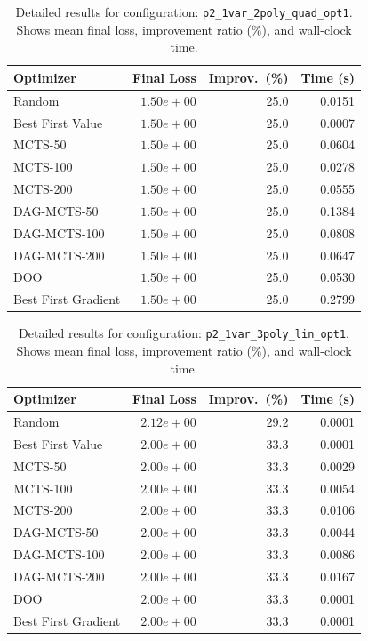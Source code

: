 \begin{table}[H]
\centering
\caption{Detailed results for configuration: \texttt{p2\_1var\_2poly\_quad\_opt1}. Shows mean final loss, improvement ratio (\%), and wall-clock time.}
\label{tab:abssum-detail-2}
\begin{tabular}{lrrr}
\toprule
Optimizer & Final Loss & Improv.~(\%) & Time (s) \\
\midrule
Random & \textbf{$1.50e+00$} & 25.0 & 0.0151 \\
\hline
Best First Value & \textbf{$1.50e+00$} & 25.0 & 0.0007 \\
\hline
MCTS-50 & \textbf{$1.50e+00$} & 25.0 & 0.0604 \\
\hline
MCTS-100 & \textbf{$1.50e+00$} & 25.0 & 0.0278 \\
\hline
MCTS-200 & \textbf{$1.50e+00$} & 25.0 & 0.0555 \\
\hline
DAG-MCTS-50 & \textbf{$1.50e+00$} & 25.0 & 0.1384 \\
\hline
DAG-MCTS-100 & \textbf{$1.50e+00$} & 25.0 & 0.0808 \\
\hline
DAG-MCTS-200 & \textbf{$1.50e+00$} & 25.0 & 0.0647 \\
\hline
DOO & \textbf{$1.50e+00$} & 25.0 & 0.0530 \\
\hline
Best First Gradient & \textbf{$1.50e+00$} & 25.0 & 0.2799 \\
\bottomrule
\end{tabular}
\end{table}

\begin{table}[H]
\centering
\caption{Detailed results for configuration: \texttt{p2\_1var\_3poly\_lin\_opt1}. Shows mean final loss, improvement ratio (\%), and wall-clock time.}
\label{tab:abssum-detail-3}
\begin{tabular}{lrrr}
\toprule
Optimizer & Final Loss & Improv.~(\%) & Time (s) \\
\midrule
Random & $2.12e+00$ & 29.2 & 0.0001 \\
\hline
Best First Value & \textbf{$2.00e+00$} & 33.3 & 0.0001 \\
\hline
MCTS-50 & \textbf{$2.00e+00$} & 33.3 & 0.0029 \\
\hline
MCTS-100 & \textbf{$2.00e+00$} & 33.3 & 0.0054 \\
\hline
MCTS-200 & \textbf{$2.00e+00$} & 33.3 & 0.0106 \\
\hline
DAG-MCTS-50 & \textbf{$2.00e+00$} & 33.3 & 0.0044 \\
\hline
DAG-MCTS-100 & \textbf{$2.00e+00$} & 33.3 & 0.0086 \\
\hline
DAG-MCTS-200 & \textbf{$2.00e+00$} & 33.3 & 0.0167 \\
\hline
DOO & $2.00e+00$ & 33.3 & 0.0001 \\
\hline
Best First Gradient & $2.00e+00$ & 33.3 & 0.0001 \\
\bottomrule
\end{tabular}
\end{table}

